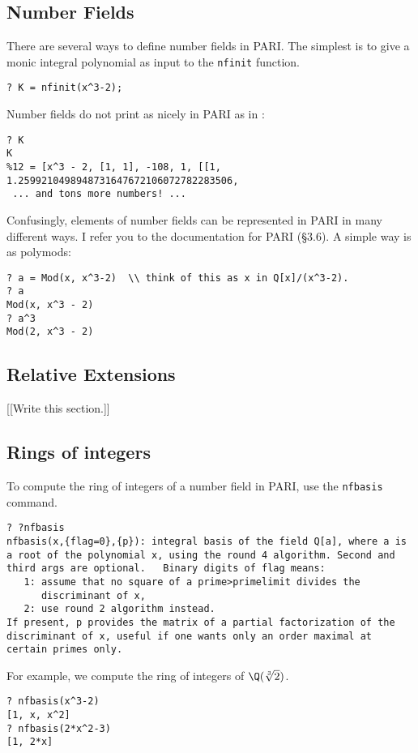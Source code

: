 \subsection{Number Fields}
There are several ways to define number fields in PARI.  The simplest is to
give a monic integral polynomial as input to the {\tt nfinit} function.
\begin{verbatim}
? K = nfinit(x^3-2);
\end{verbatim}
Number fields do not print as nicely in PARI as in \magma{}:
\begin{verbatim}
? K
K
%12 = [x^3 - 2, [1, 1], -108, 1, [[1, 1.2599210498948731647672106072782283506,
 ... and tons more numbers! ...
\end{verbatim}
Confusingly, elements of number fields can be represented in PARI in many different ways. 
I refer you to the documentation for PARI (\S3.6).  A simple way is as polymods:
\begin{verbatim}
? a = Mod(x, x^3-2)  \\ think of this as x in Q[x]/(x^3-2).
? a
Mod(x, x^3 - 2)
? a^3
Mod(2, x^3 - 2)
\end{verbatim}

\subsection{Relative Extensions}
[[Write this section.]]

\subsection{Rings of integers}
To compute the ring of integers of a number field in PARI, 
use the {\tt nfbasis} command.
\begin{verbatim}
? ?nfbasis
nfbasis(x,{flag=0},{p}): integral basis of the field Q[a], where a is 
a root of the polynomial x, using the round 4 algorithm. Second and
third args are optional.   Binary digits of flag means:
   1: assume that no square of a prime>primelimit divides the 
      discriminant of x, 
   2: use round 2 algorithm instead. 
If present, p provides the matrix of a partial factorization of the 
discriminant of x, useful if one wants only an order maximal at 
certain primes only.
\end{verbatim}

For example, we compute the ring of integers of $\Q(\sqrt[3]{2})$.
\begin{verbatim}
? nfbasis(x^3-2)
[1, x, x^2]
? nfbasis(2*x^2-3)
[1, 2*x]
\end{verbatim}

